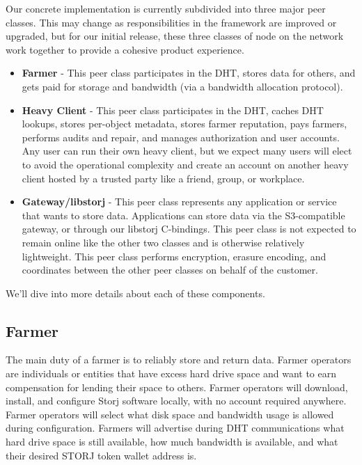 \documentclass[a4paper,10pt]{article} \usepackage[utf8]{inputenc}
\begin{document}
Our concrete implementation is currently subdivided into three major peer
classes. This may change as responsibilities in the framework are improved or
upgraded, but for our initial release, these three classes of node on the
network work together to provide a cohesive product experience.

\begin{itemize}
\item {\bf Farmer} - This peer class participates in the DHT, stores data for
  others, and gets paid for storage and bandwidth (via a bandwidth allocation
  protocol).
\item {\bf Heavy Client} - This peer class participates in the DHT, caches
  DHT lookups, stores per-object metadata, stores farmer reputation, pays
  farmers, performs audits and repair, and manages authorization and user
  accounts. Any user can run their own heavy client, but we expect many users
  will elect to avoid the operational complexity and create an account on
  another heavy client hosted by a trusted party like a friend, group, or
  workplace.
\item {\bf Gateway/libstorj} - This peer class represents any application or
  service that wants to store data. Applications can store data via the
  S3-compatible gateway, or through our libstorj C-bindings. This peer class
  is not expected to remain online like the other two classes and is otherwise
  relatively lightweight. This peer class performs encryption, erasure encoding,
  and coordinates between the other peer classes on behalf of the customer.
\end{itemize}

We'll dive into more details about each of these components.

\subsection{Farmer}

The main duty of a farmer is to reliably store and return data. Farmer operators
are individuals or entities that have excess hard drive space and want to earn
compensation for lending their space to others. Farmer operators will download,
install, and configure Storj software locally, with no account required
anywhere. Farmer operators will select what disk space and bandwidth usage
is allowed during configuration.
Farmers will advertise during DHT communications what hard drive space is still
available, how much bandwidth is available, and what their desired STORJ token
wallet address is.
\end{document}
